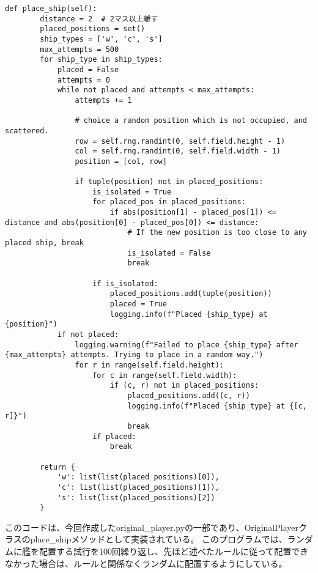 \documentclass[a4paper,10pt]{ltjsarticle}
\begin{document}
\begin{verbatim}
def place_ship(self):
        distance = 2  # 2マス以上離す
        placed_positions = set()
        ship_types = ['w', 'c', 's']
        max_attempts = 500
        for ship_type in ship_types:
            placed = False
            attempts = 0
            while not placed and attempts < max_attempts:
                attempts += 1

                # choice a random position which is not occupied, and scattered.
                row = self.rng.randint(0, self.field.height - 1)
                col = self.rng.randint(0, self.field.width - 1)
                position = [col, row]

                if tuple(position) not in placed_positions:
                    is_isolated = True
                    for placed_pos in placed_positions:
                        if abs(position[1] - placed_pos[1]) <= distance and abs(position[0] - placed_pos[0]) <= distance:
                            # If the new position is too close to any placed ship, break
                            is_isolated = False
                            break
                    
                    if is_isolated:
                        placed_positions.add(tuple(position))
                        placed = True
                        logging.info(f"Placed {ship_type} at {position}")
            if not placed:
                logging.warning(f"Failed to place {ship_type} after {max_attempts} attempts. Trying to place in a random way.")
                for r in range(self.field.height):
                    for c in range(self.field.width):
                        if (c, r) not in placed_positions:
                            placed_positions.add((c, r))
                            logging.info(f"Placed {ship_type} at {[c, r]}")
                            break
                    if placed:
                        break

        return {
            'w': list(list(placed_positions)[0]),
            'c': list(list(placed_positions)[1]),
            's': list(list(placed_positions)[2])
        }
\end{verbatim}

このコードは、今回作成したoriginal\_player.pyの一部であり、OriginalPlayerクラスのplace\_shipメソッドとして実装されている。
このプログラムでは、ランダムに艦を配置する試行を100回繰り返し、先ほど述べたルールに従って配置できなかった場合は、ルールと関係なくランダムに配置するようにしている。
\end{document}
